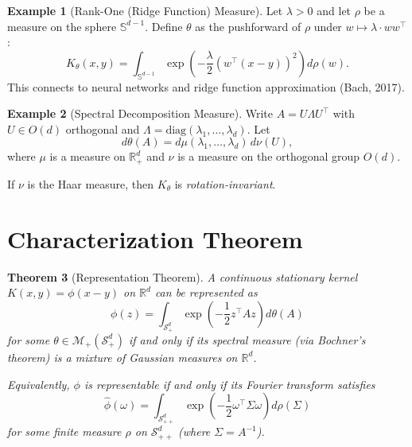 \documentclass[11pt]{article}
\newtheorem{theorem}{Theorem}[section]
\theoremstyle{definition}
\newtheorem{example}[theorem]{Example}
\newcommand{\R}{\mathbb{R}}
\newcommand{\Splus}{\mathcal{S}_+^d}
\newcommand{\Splusplus}{\mathcal{S}_{++}^d}
\newcommand{\M}{\mathcal{M}}
\begin{document}
\begin{example}[Rank-One (Ridge Function) Measure]
Let $\lambda > 0$ and let $\rho$ be a measure on the sphere $\mathbb{S}^{d-1}$. Define $\theta$ as the pushforward of $\rho$ under $w \mapsto \lambda \cdot ww^\top$:
\begin{equation}
    K_\theta(x,y) = \int_{\mathbb{S}^{d-1}} \exp\left(-\frac{\lambda}{2}(w^\top(x-y))^2\right) d\rho(w).
\end{equation}
This connects to neural networks and ridge function approximation (Bach, 2017).
\end{example}

\begin{example}[Spectral Decomposition Measure]
Write $A = U \Lambda U^\top$ with $U \in O(d)$ orthogonal and $\Lambda = \text{diag}(\lambda_1, \ldots, \lambda_d)$. Let
\begin{equation}
    d\theta(A) = d\mu(\lambda_1, \ldots, \lambda_d) \, d\nu(U),
\end{equation}
where $\mu$ is a measure on $\R_+^d$ and $\nu$ is a measure on the orthogonal group $O(d)$.

If $\nu$ is the Haar measure, then $K_\theta$ is \emph{rotation-invariant}.
\end{example}

\section{Characterization Theorem}

\begin{theorem}[Representation Theorem]
\label{thm:representation}
A continuous stationary kernel $K(x,y) = \phi(x-y)$ on $\R^d$ can be represented as
\begin{equation}
    \phi(z) = \int_{\Splus} \exp\left(-\frac{1}{2}z^\top A z\right) d\theta(A)
\end{equation}
for some $\theta \in \M_+(\Splus)$ if and only if its spectral measure (via Bochner's theorem) is a mixture of Gaussian measures on $\R^d$.

Equivalently, $\phi$ is representable if and only if its Fourier transform satisfies
\begin{equation}
    \hat{\phi}(\omega) = \int_{\Splusplus} \exp\left(-\frac{1}{2}\omega^\top \Sigma \omega\right) d\rho(\Sigma)
\end{equation}
for some finite measure $\rho$ on $\Splusplus$ (where $\Sigma = A^{-1}$).
\end{theorem}
\end{document}
